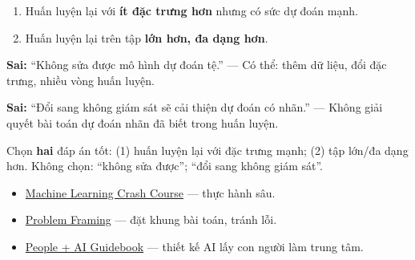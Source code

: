 \documentclass[12pt,a4paper]{article}
\begin{document}
\begin{phuongphap}[title={Khi dự đoán lệch nhiều --- hai hướng hiệu quả}]
\begin{enumerate}
  \item Huấn luyện lại với \textbf{ít đặc trưng hơn} nhưng có sức dự đoán mạnh.
  \item Huấn luyện lại trên tập \textbf{lớn hơn, đa dạng hơn}.
\end{enumerate}
\end{phuongphap}

\begin{phanvidu}
\textbf{Sai:} ``Không sửa được mô hình dự đoán tệ.'' --- Có thể: thêm dữ liệu, đổi đặc trưng, nhiều vòng huấn luyện.

\textbf{Sai:} ``Đổi sang không giám sát sẽ cải thiện dự đoán có nhãn.'' --- Không giải quyết bài toán dự đoán nhãn đã biết trong huấn luyện.
\end{phanvidu}

\begin{luuy}[title={Cải thiện mô hình}]
Chọn \textbf{hai} đáp án tốt: (1) huấn luyện lại với đặc trưng mạnh; (2) tập lớn/đa dạng hơn. Không chọn: ``không sửa được''; ``đổi sang không giám sát''.
\end{luuy}

\begin{tongket}[title={Bước tiếp theo trong hành trình ML}]
\begin{itemize}
  \item \href{https://developers.google.com/machine-learning/crash-course}{Machine Learning Crash Course} --- thực hành sâu.
  \item \href{https://developers.google.com/machine-learning/problem-framing}{Problem Framing} --- đặt khung bài toán, tránh lỗi.
  \item \href{https://pair.withgoogle.com/guidebook/}{People + AI Guidebook} --- thiết kế AI lấy con người làm trung tâm.
\end{itemize}
\end{tongket}
\end{document}
